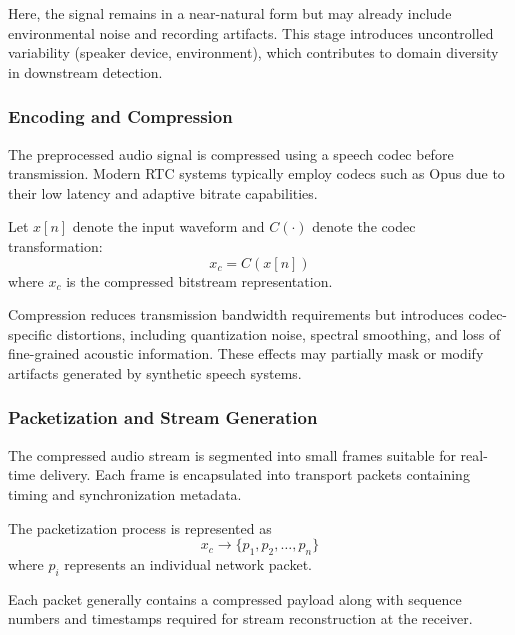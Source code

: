 Here, the signal remains in a near-natural form but may already include environmental noise and recording artifacts. This stage introduces uncontrolled variability (speaker device, environment), which contributes to domain diversity in downstream detection.

\subsubsection{Encoding and Compression}

The preprocessed audio signal is compressed using a speech codec before transmission. Modern RTC systems typically employ codecs such as Opus due to their low latency and adaptive bitrate capabilities. 

Let $x[n]$ denote the input waveform and $C(\cdot)$ denote the codec transformation:
\begin{equation}
x_c = C(x[n])
\label{eq:codec_transform}
\end{equation}
where $x_c$ is the compressed bitstream representation.

Compression reduces transmission bandwidth requirements but introduces codec-specific distortions, including quantization noise, spectral smoothing, and loss of fine-grained acoustic information. These effects may partially mask or modify artifacts generated by synthetic speech systems.

\subsubsection{Packetization and Stream Generation}

The compressed audio stream is segmented into small frames suitable for real-time delivery. Each frame is encapsulated into transport packets containing timing and synchronization metadata.

The packetization process is represented as
\begin{equation}
x_c \rightarrow \{p_1, p_2, \ldots, p_n\}
\label{eq:packetization}
\end{equation}
where $p_i$ represents an individual network packet.

Each packet generally contains a compressed payload along with sequence numbers and timestamps required for stream reconstruction at the receiver.